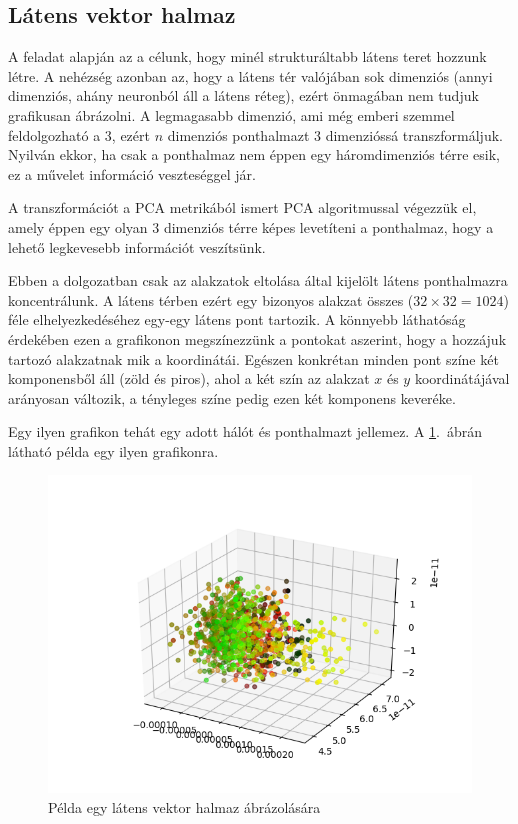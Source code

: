 \subsection{Látens vektor halmaz}

A feladat alapján az a célunk, hogy minél strukturáltabb látens teret hozzunk létre. A nehézség azonban az, hogy a látens tér valójában sok dimenziós (annyi dimenziós, ahány neuronból áll a látens réteg), ezért önmagában nem tudjuk grafikusan ábrázolni. A legmagasabb dimenzió, ami még emberi szemmel feldolgozható a $3$, ezért $n$ dimenziós ponthalmazt $3$ dimenzióssá transzformáljuk. Nyilván ekkor, ha csak a ponthalmaz nem éppen egy háromdimenziós térre esik, ez a művelet információ veszteséggel jár.

A transzformációt a PCA metrikából ismert PCA algoritmussal végezzük el, amely éppen egy olyan $3$ dimenziós térre képes levetíteni a ponthalmaz, hogy a lehető legkevesebb információt veszítsünk.

Ebben a dolgozatban csak az alakzatok eltolása által kijelölt látens ponthalmazra koncentrálunk. A látens térben ezért egy bizonyos alakzat összes ($32\times32=1024$) féle elhelyezkedéséhez egy-egy látens pont tartozik. A könnyebb láthatóság érdekében ezen a grafikonon megszínezzünk a pontokat aszerint, hogy a hozzájuk tartozó alakzatnak mik a koordinátái. Egészen konkrétan minden pont színe két komponensből áll (zöld és piros), ahol a két szín az alakzat $x$ és $y$ koordinátájával arányosan változik, a tényleges színe pedig ezen két komponens keveréke. 

Egy ilyen grafikon tehát egy adott hálót és ponthalmazt jellemez. A \ref{m3D}.~ábrán látható példa egy ilyen grafikonra.

\begin{figure}[h!]
\begin{center} 
	\begin{center}
	\includegraphics[width=1\linewidth]{3D-example.png}
	\end{center}
	
  \caption{Példa egy látens vektor halmaz ábrázolására}\label{m3D}
\end{center}
\end{figure}

